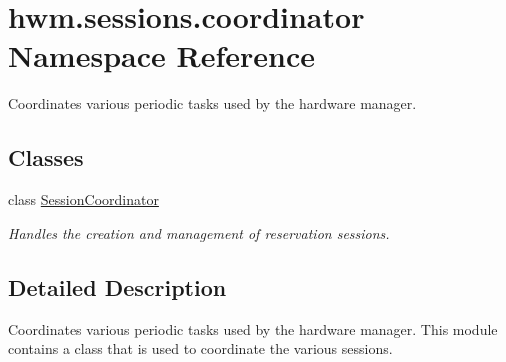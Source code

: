 \hypertarget{namespacehwm_1_1sessions_1_1coordinator}{\section{hwm.\-sessions.\-coordinator Namespace Reference}
\label{namespacehwm_1_1sessions_1_1coordinator}
}


Coordinates various periodic tasks used by the hardware manager.  


\subsection*{Classes}
\begin{DoxyCompactItemize}
\item 
class \hyperlink{classhwm_1_1sessions_1_1coordinator_1_1_session_coordinator}{Session\-Coordinator}
\begin{DoxyCompactList}\small\item\em Handles the creation and management of reservation sessions. \end{DoxyCompactList}\end{DoxyCompactItemize}


\subsection{Detailed Description}
Coordinates various periodic tasks used by the hardware manager. This module contains a class that is used to coordinate the various sessions. 